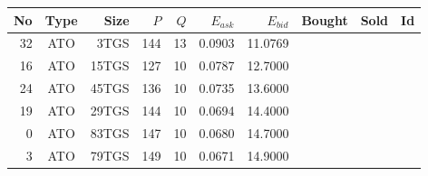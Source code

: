 \begin{tabular}{|r|c|r|r|r|r|r|p{2cm}|p{2cm}|r|}
\hline

No & Type & Size & $P$ & $Q$ & $E_{ask}$ & $E_{bid}$ & Bought & Sold & Id \\
\hline
32 & ATO & 3TGS & 144 & 13 & 0.0903 & 11.0769 &    &    &    \\
\hline
16 & ATO & 15TGS & 127 & 10 & 0.0787 & 12.7000 &    &    &    \\
\hline
24 & ATO & 45TGS & 136 & 10 & 0.0735 & 13.6000 &    &    &    \\
\hline
19 & ATO & 29TGS & 144 & 10 & 0.0694 & 14.4000 &    &    &    \\
\hline
0 & ATO & 83TGS & 147 & 10 & 0.0680 & 14.7000 &    &    &    \\
\hline
3 & ATO & 79TGS & 149 & 10 & 0.0671 & 14.9000 &    &    &    \\
\hline
\end{tabular}
